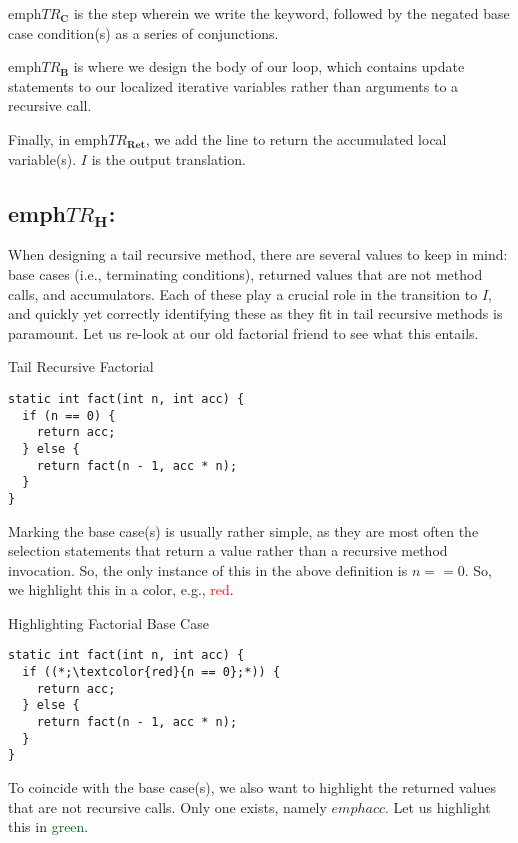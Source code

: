 emph{$TR_\mathbf{C}$} is the step wherein we write the  keyword, followed by the negated base case condition(s) as a series of conjunctions.

emph{$TR_\mathbf{B}$} is where we design the body of our loop, which contains update statements to our localized iterative variables rather than arguments to a recursive call.

Finally, in emph{$TR_\mathbf{Ret}$}, we add the line to return the accumulated local variable(s). $I$ is the output translation.

\subsection{emph{$TR_\mathbf{H}$:}} When designing a tail recursive method, there are several values to keep in mind: base cases (i.e., terminating conditions), returned values that are not method calls, and accumulators. Each of these play a crucial role in the transition to $I$, and quickly yet correctly identifying these as they fit in tail recursive methods is paramount. Let us re-look at our old factorial friend to see what this entails.

\begin{cl}[]{Tail Recursive Factorial}
\begin{lstlisting}[language=MyJava]
static int fact(int n, int acc) {
  if (n == 0) {
    return acc;
  } else {
    return fact(n - 1, acc * n);
  }
}
\end{lstlisting}
\end{cl}

Marking the base case(s) is usually rather simple, as they are most often the selection statements that return a value rather than a recursive method invocation. So, the only instance of this in the above definition is $n == 0$. So, we highlight this in a color, e.g., \textcolor{red}{red}.

\begin{cl}[]{Highlighting Factorial Base Case}
\begin{lstlisting}[language=MyJava]
static int fact(int n, int acc) {
  if ((*;\textcolor{red}{n == 0};*)) {
    return acc;
  } else {
    return fact(n - 1, acc * n);
  }
}
\end{lstlisting}
\end{cl}

To coincide with the base case(s), we also want to highlight the returned values that are not recursive calls. Only one exists, namely $emph{acc}$. Let us highlight this in \textcolor{darkgreen}{green}.

